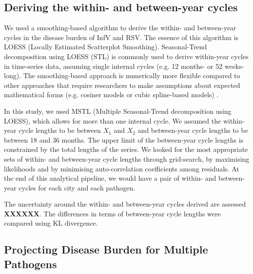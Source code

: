 \documentclass{article}
\begin{document}
\subsection{Deriving the within- and between-year cycles}
We used a smoothing-based algorithm to derive the within- and between-year cycles in the disease burden of InfV and RSV. The essence of this algorithm is LOESS (Locally Estimated Scatterplot Smoothing). Seasonal-Trend decomposition using LOESS (STL) is commonly used to derive within-year cycles in time-series data, assuming single internal cycles (e.g. 12 months- or 52 weeks-long). The smoothing-based approach is numerically more flexible compared to other approaches that require researchers to make assumptions about expected mathematical forms (e.g. cosiner models or cubic spline-based models) \cite{madaniyazi2022assessing}.  

In this study, we used MSTL (Multiple Seasonal-Trend decomposition using LOESS), which allows for more than one internal cycle. We assumed the within-year cycle lengths to be between $X_1$ and $X_2$ and between-year cycle lengths to be between 18 and 36 months. The upper limit of the between-year cycle lengths is constrained by the total lengths of the series. We looked for the most appropriate sets of within- and between-year cycle lengths through grid-search, by maximising likelihoods and by minimising auto-correlation coefficients among residuals. At the end of this analytical pipeline, we would have a pair of within- and between-year cycles for each city and each pathogen. 

The uncertainty around the within- and between-year cycles derived are assessed \textbf{XXXXXX}. The differences in terms of between-year cycle lengths were compared using KL divergence.


\newpage


\newpage







\subsection{Projecting Disease Burden for Multiple Pathogens }
\end{document}
